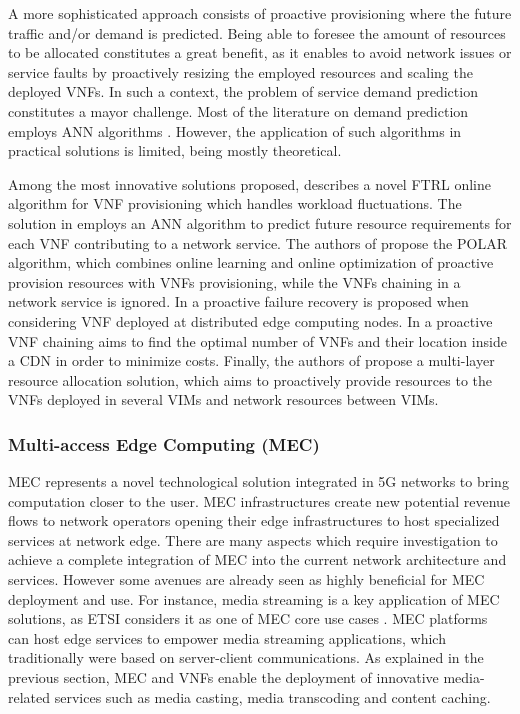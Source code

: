 A more sophisticated approach consists of proactive provisioning where the future traffic and/or demand is predicted. Being able to foresee the amount of resources to be allocated constitutes a great benefit, as it enables to avoid network issues or service faults by proactively resizing the employed resources and scaling the deployed VNFs. In such a context, the problem of service demand prediction constitutes a mayor challenge. Most of the literature on demand prediction employs ANN algorithms \cite{Tedjopurnomo2020, Sandhir2008}. However, the application of such algorithms in practical solutions is limited, being mostly theoretical. %

Among the most innovative solutions proposed, \cite{Fei2018} describes a novel FTRL online algorithm for VNF provisioning which handles workload fluctuations. The solution in \cite{Mijumbi2016-2} employs an ANN algorithm to predict future resource requirements for each VNF contributing to a network service. The authors of \cite{Zhang2017} propose the POLAR algorithm, which combines online learning and online optimization of proactive provision resources with VNFs provisioning, while the VNFs chaining in a network service is ignored. In \cite{Huang2019} a proactive failure recovery is proposed when considering VNF deployed at distributed edge computing nodes. In \cite{Dieye2018} a proactive VNF chaining aims to find the optimal number of VNFs and their location inside a CDN in order to minimize costs. Finally, the authors of \cite{Moreno2019} propose a multi-layer resource allocation solution, which aims to proactively provide resources to the VNFs deployed in several VIMs and network resources between VIMs.

\subsubsection{Multi-access Edge Computing (MEC)}

MEC represents a novel technological solution integrated in 5G networks to bring computation closer to the user. %
MEC infrastructures create new potential revenue flows to network operators opening their edge infrastructures to host specialized services at network edge. 
There are many aspects which require investigation to achieve a complete integration of MEC into the current network architecture and services. However some avenues are already seen as highly beneficial for MEC deployment and use.
For instance, media streaming is a key application of MEC solutions, as ETSI considers it as one of MEC core use cases \cite{etsigsmec002}. 
MEC platforms can host edge services to empower media streaming applications, which traditionally were based on server-client communications. As explained in the previous section, MEC and VNFs enable the deployment of innovative media-related services such as media casting, media transcoding and content caching.

